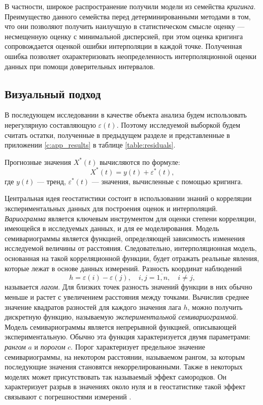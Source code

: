 В частности, широкое распространение получили модели из семейства \textit{кригинга}. Преимущество данного семейства перед детерминированными методами в том, что они позволяют получить наилучшую в статистическом смысле оценку  --- несмещенную оценку с минимальной дисперсией, при этом оценка кригинга сопровождается оценкой ошибки интерполяции в каждой точке. Полученная ошибка позволяет охарактеризовать неопределенность интерполяционной оценки данных при помощи доверительных интервалов.

\subsection{Визуальный подход} %
\label{sec:_variogram}
В последующем исследовании в качестве объекта анализа будем использовать нерегулярную составляющую $ \varepsilon(t) $. Поэтому исследуемой выборкой будем считать остатки, полученные в предыдущем разделе и представленные в приложении \ref{c:app_results} в таблице \ref{table:residuals}.

Прогнозные значения $ X^{*}(t) $ вычисляются по формуле:
\begin{equation*}
	X^{*}(t) = y(t) + \varepsilon^{*}(t),
\end{equation*}
где $ y(t) $ --- тренд, $ \varepsilon^{*}(t) $ --- значения, вычисленные с помощью кригинга.

Центральная идея геостатистики состоит в использовании знаний о корреляции экспериментальных данных для построения оценок и интерполяций. \textit{Вариограмма} является ключевым инструментом для оценки степени корреляции, имеющейся в исследуемых данных, и для ее моделирования. Модель семивариограммы является функцией, определяющей зависимость изменения исследуемой величины от расстояния. Следовательно, интерполяционная модель, основанная на такой корреляционной функции, будет отражать реальные явления, которые лежат в основе данных измерений. Разность координат наблюдений
\begin{equation*}
	h = \varepsilon(i) - \varepsilon(j), \quad i, j = \overline{1,n}, \quad i \neq j,
\end{equation*}
называется \textit{лагом}. Для близких точек разность значений функции в них обычно меньше и растет с увеличением расстояния между точками. Вычислив среднее значение квадратов разностей для каждого значения лага $h$, можно получить дискретную функцию, называемую \textit{экспериментальной семивариограммой}. Модель семивариограммы является непрерывной функцией, описывающей экспериментальную. Обычно эта функция характеризуется двумя параметрами: \textit{рангом} $ a $ и \textit{порогом} $ c $. Порог характеризует предельное значение семивариограммы, на некотором расстоянии, называемом рангом, за которым последующие значения становятся некоррелированными. Также в некоторых моделях может присутствовать так называемый эффект самородков. Он характеризует разрыв в значениях около нуля и в геостатистике такой эффект связывают с погрешностями измерений \cite{saveliev2012}.

